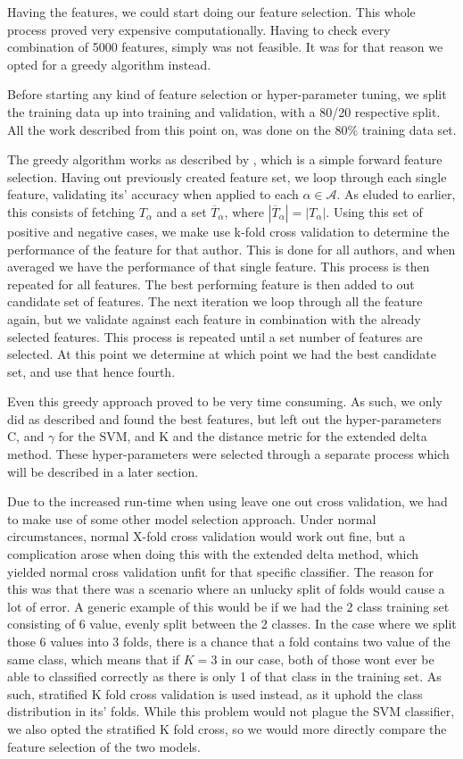 Having the features, we could start doing our feature selection. This whole
process proved very expensive computationally. Having to check every combination
of 5000 features, simply was not feasible. It was for that reason we opted for a
greedy algorithm instead.

Before starting any kind of feature selection or hyper-parameter tuning,
we split the training data up into training and validation, with a
80/20 respective split. All the work described from this point on,
was done on the 80\% training data set.

The greedy algorithm works as described by \cite{kanDeng}, which is a simple
forward feature selection. Having out previously created feature set, we loop
through each single feature, validating its' accuracy when applied to each
$\alpha \in \mathcal{A}$. As eluded to earlier, this consists of fetching
$T_{\alpha}$ and a set $\overline{T}_{\alpha}$, where $|\overline{T}_\alpha| =
|T_\alpha|$. Using this set of positive and negative cases, we make use k-fold
cross validation to determine the performance of the feature for that author.
This is done for all authors, and when averaged we have the performance of
that single feature. This process is then repeated for all features. The best
performing feature is then added to out candidate set of features. The next
iteration we loop through all the feature again, but we validate against each
feature in combination with the already selected features. This process is
repeated until a set number of features are selected. At this point we determine
at which point we had the best candidate set, and use that hence fourth.

Even this greedy approach proved to be very time consuming. As such, we only did
as described and found the best features, but left out the hyper-parameters C,
and $\gamma$ for the SVM, and K and the distance metric for the extended delta
method. These hyper-parameters were selected through a separate process
which will be described in a later section.

Due to the increased run-time when using leave one out cross validation,
we had to make use of some other model selection approach. Under normal
circumstances, normal X-fold cross validation would work out fine, but a complication
arose when doing this with the extended delta method, which yielded normal
cross validation unfit for that specific classifier.
The reason for this was that there was a scenario where an unlucky split of
folds would cause a lot of error. A generic example of this would be if we
had the 2 class training set consisting of 6 value, evenly split between the
2 classes. In the case where we split those 6 values into 3 folds, there is a
chance that a fold contains two value of the same class, which means that if $K
= 3$ in our case, both of those wont ever be able to classified correctly as
there is only 1 of that class in the training set. As such, stratified K fold
cross validation is used instead, as it uphold the class distribution in its'
folds. While this problem would not plague the SVM classifier, we also opted
the stratified K fold cross, so we would more directly compare the feature selection
of the two models.

